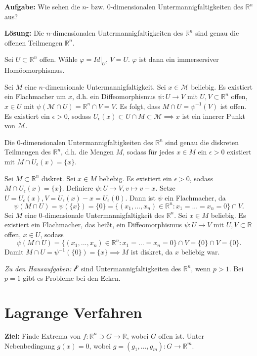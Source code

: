 \documentclass[a4paper, landscape,twocolumn,fontsize=9pt]{scrartcl}
\begin{document}
\textbf{Aufgabe:} Wie sehen die $n$- bzw. $0$-dimensionalen Untermannigfaltigkeiten des $\mathbb R^n$ aus?

\textbf{Lösung:} Die $n$-dimensionalen Untermannigfaltigkeiten des $\mathbb R^n$ sind genau die offenen Teilmengen $\mathbb R^n$. 

Sei $U \subset \mathbb R^n$ offen. Wähle $\varphi = Id |_U$, $V=U$. $\varphi$ ist dann ein immersersiver Homöomorphismus.

Sei $M$ eine $n$-dimensionale Untermannigfaltigkeit. Sei $x \in \mathcal M$ beliebig. Es existiert ein Flachmacher um $x$, d.h. ein Diffeomorphismus $\psi: U \to V$ mit $U,V \subset \mathbb R^n$ offen, $x \in U$ mit $\psi(\mathcal M \cap U) = \mathbb R^n \cap V = V$. Es folgt, dass $M \cap U = \psi^{-1}(V)$ ist offen. Es existiert ein $\epsilon > 0$, sodass $U_{\epsilon}(x) \subset U \cap M \subset \mathcal M \implies x$ ist ein innerer Punkt von $\mathcal M$.

Die $0$-dimensionalen Untermannigfaltigkeiten des $\mathbb R^n$ sind genau die diskreten Teilmengen des $\mathbb R^n$, d.h. die Mengen $M$, sodass für jedes $x \in M$ ein $\epsilon > 0$ existiert mit $M \cap U_{\epsilon}(x) = \{ x \}$.

Sei $M \subset \mathbb R^n$ diskret. Sei $x \in M$ beliebig. Es existiert ein $\epsilon > 0$, sodass $M \cap U_\epsilon(x) = \{ x\}$. Definiere $\psi: U \to V, v \mapsto v - x$. Setze $U = U_{\epsilon}(x), V = U_\epsilon(x) - x = U_\epsilon(0)$. Dann ist $\psi$ ein Flachmacher, da 
\[
	\psi(M \cap U) = \psi(\{ x \}) = \{ 0 \} = \{ (x_1,...,x_n) \in \mathbb R^n: x_1=...=x_n = 0 \} \cap V.
\] 
Sei $M$ eine $0$-dimensionale Untermannigfaltigkeit des $\mathbb R^n$. Sei $x \in M$ beliebig. Es existiert ein Flachmacher, das heißt, ein Diffeomorphismus $\psi: U \to V$ mit $U,V \subset \mathbb R$ offen, $x \in U$, sodass
\[
	\psi(M \cap U) = \{ (x_1,...,x_n) \in \mathbb R^n: x_1 = ... = x_n = 0 \} \cap V = \{ 0 \} \cap V = \{ 0 \}.
\]
Damit $M \cap U = \psi^{-1} (\{ 0 \} ) = \{ x \} \implies M$ ist diskret, da $x$ beliebig war.

\textit{Zu den Hausaufgaben:} $\mathcal l^p$ sind Untermannigfaltigkeiten des $\mathbb R^n$, wenn $p > 1$. Bei $p = 1$ gibt es Probleme bei den Ecken.

\section{Lagrange Verfahren}
\textbf{Ziel:} Finde Extrema von $f: \mathbb R^n \supset G \to \mathbb R$, wobei $G$ offen ist. Unter Nebenbedingung $g(x) = 0$, wobei $g=(g_1,...,g_m) : G \to \mathbb R^m$.
\end{document}
